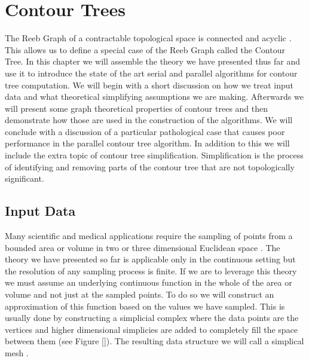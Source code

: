 \chapter{Contour Trees}
\label{chapter3}


The Reeb Graph of a contractable topological space is connected and acyclic \cite{comp-topo}. This allows us to define a special case of the Reeb Graph called the Contour Tree.  In this chapter we will assemble the theory we have presented thus far and use it to introduce the state of the art serial and parallel algorithms for contour tree computation. We will begin with a short discussion on how we treat input data and what theoretical simplifying assumptions we are making. Afterwards we will present some graph theoretical properties of contour trees and then demonstrate how those are used in the construction of the algorithms. We will conclude with a discussion of a particular pathological case that causes poor performance in the parallel contour tree algorithm. In addition to this we will include the extra topic of contour tree simplification. Simplification is the process of identifying and removing parts of the contour tree that are not topologically significant.


\section{Input Data}




Many scientific and medical applications require the sampling of points from a bounded area or volume in two or three dimensional Euclidean space \cite{carr-masters}. The theory we have presented so far is applicable only in the continuous setting but the resolution of any sampling process is finite. If we are to leverage this theory we must assume an underlying continuous function in the whole of the area or volume and not just at the sampled points. To do so we will construct an approximation of this function based on the values we have sampled. This is usually done by constructing a simplicial complex where the data points are the vertices and higher dimensional simplicies are added to completely fill the space between them (see Figure []). The resulting data structure we will call a simplical mesh \cite{carr-masters}.

